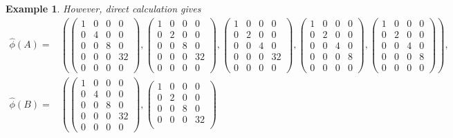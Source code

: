 \documentclass[reqno, 12pt]{article}
\theoremstyle{mydefinition}
\theoremstyle{myremark}
\newtheorem{exa}[thm]{Example}
\numberwithin{algorithm}{section}
\begin{document}
\begin{exa}
However, direct calculation gives
\begin{align*}
  \hat{\phi}(A)= & \left(
\begin{pmatrix}
1 & 0 & 0 & 0
\\
 0 & 4 & 0 & 0
\\
 0 & 0 & 8 & 0
\\
 0 & 0 & 0 & 32
\\
 0 & 0 & 0 & 0
\end{pmatrix}
,
\begin{pmatrix}
1 & 0 & 0 & 0
\\
 0 & 2 & 0 & 0
\\
 0 & 0 & 8 & 0
\\
 0 & 0 & 0 & 32
\\
 0 & 0 & 0 & 0
\end{pmatrix}
,
\begin{pmatrix}
1 & 0 & 0 & 0
\\
 0 & 2 & 0 & 0
\\
 0 & 0 & 4 & 0
\\
 0 & 0 & 0 & 32
\\
 0 & 0 & 0 & 0
\end{pmatrix}
,
\begin{pmatrix}
1 & 0 & 0 & 0
\\
 0 & 2 & 0 & 0
\\
 0 & 0 & 4 & 0
\\
 0 & 0 & 0 & 8
\\
 0 & 0 & 0 & 0
\end{pmatrix}
,
\begin{pmatrix}
1 & 0 & 0 & 0
\\
 0 & 2 & 0 & 0
\\
 0 & 0 & 4 & 0
\\
 0 & 0 & 0 & 8
\\
 0 & 0 & 0 & 0
\end{pmatrix}
\right), \\
   \hat{\phi}(B)= &\left(
\begin{pmatrix}
1 & 0 & 0 & 0
\\
 0 & 4 & 0 & 0
\\
 0 & 0 & 8 & 0
\\
 0 & 0 & 0 & 32
\\
 0 & 0 & 0 & 0
\end{pmatrix}
,
\begin{pmatrix}
1 & 0 & 0 & 0
\\
 0 & 2 & 0 & 0
\\
 0 & 0 & 8 & 0
\\
 0 & 0 & 0 & 32
\\

\end{pmatrix}
\end{align*}
\end{exa}
\end{document}
